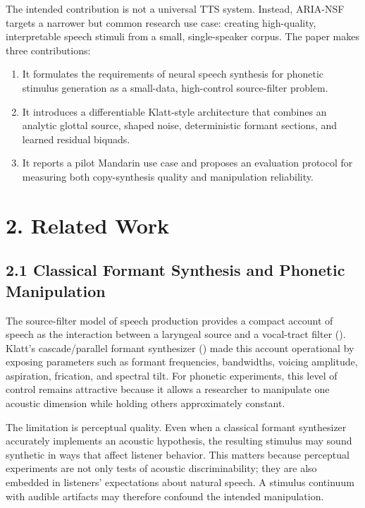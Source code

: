 \documentclass[
  10pt,
]{article}
\providecommand{\tightlist}{%
  \setlength{\itemsep}{0pt}\setlength{\parskip}{0pt}}
\begin{document}
The intended contribution is not a universal TTS system. Instead,
ARIA-NSF targets a narrower but common research use case: creating
high-quality, interpretable speech stimuli from a small, single-speaker
corpus. The paper makes three contributions:

\begin{enumerate}
\def\labelenumi{\arabic{enumi}.}
\tightlist
\item
  It formulates the requirements of neural speech synthesis for phonetic
  stimulus generation as a small-data, high-control source-filter
  problem.
\item
  It introduces a differentiable Klatt-style architecture that combines
  an analytic glottal source, shaped noise, deterministic formant
  sections, and learned residual biquads.
\item
  It reports a pilot Mandarin use case and proposes an evaluation
  protocol for measuring both copy-synthesis quality and manipulation
  reliability.
\end{enumerate}

\section{2. Related Work}\label{related-work}

\subsection{2.1 Classical Formant Synthesis and Phonetic
Manipulation}\label{classical-formant-synthesis-and-phonetic-manipulation}

The source-filter model of speech production provides a compact account
of speech as the interaction between a laryngeal source and a
vocal-tract filter (). Klatt's
cascade/parallel formant synthesizer
() made this account
operational by exposing parameters such as formant frequencies,
bandwidths, voicing amplitude, aspiration, frication, and spectral tilt.
For phonetic experiments, this level of control remains attractive
because it allows a researcher to manipulate one acoustic dimension
while holding others approximately constant.

The limitation is perceptual quality. Even when a classical formant
synthesizer accurately implements an acoustic hypothesis, the resulting
stimulus may sound synthetic in ways that affect listener behavior. This
matters because perceptual experiments are not only tests of acoustic
discriminability; they are also embedded in listeners' expectations
about natural speech. A stimulus continuum with audible artifacts may
therefore confound the intended manipulation.
\end{document}
